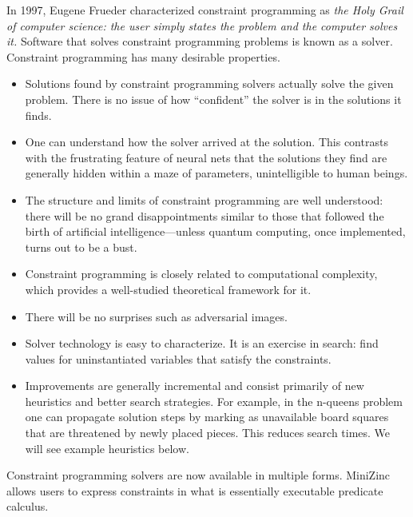 In 1997, Eugene Frueder characterized constraint programming as \textit{the Holy Grail of computer science: the user simply states the problem and the computer solves it.}\cite{freuder1997pursuit}  Software that solves constraint programming problems is known as a solver. Constraint programming has many desirable properties. 
\begin{itemize}
    \item Solutions found by constraint programming solvers actually solve the given problem. There is no issue of how ``confident'' the solver is in the solutions it finds.
    
    \item One can understand how the solver arrived at the solution. This contrasts with the frustrating feature of neural nets that the solutions they find are generally hidden within a maze of parameters, unintelligible to human beings. 

    \item  The structure and limits of constraint programming are well understood: there will be no grand disappointments similar to those that followed the birth of artificial intelligence---unless quantum computing, once implemented, turns out to be a bust. 
    
    \item Constraint programming is closely related to computational complexity, which provides a well-studied theoretical framework for it. 
    
    \item There will be no surprises such as adversarial images. 

    \item Solver technology is easy to characterize. It is an exercise in search: find values for uninstantiated variables that satisfy the constraints.

    \item Improvements are generally incremental and consist primarily of new heuristics and better search strategies. For example, in the n-queens problem one can propagate solution steps by marking as unavailable board squares that are threatened by newly placed pieces. This reduces search times. We will see  example heuristics below.

\end{itemize}

Constraint programming solvers are now available in multiple forms. MiniZinc\cite{wallace2020problem} allows users to express constraints in what is essentially executable predicate calculus.

